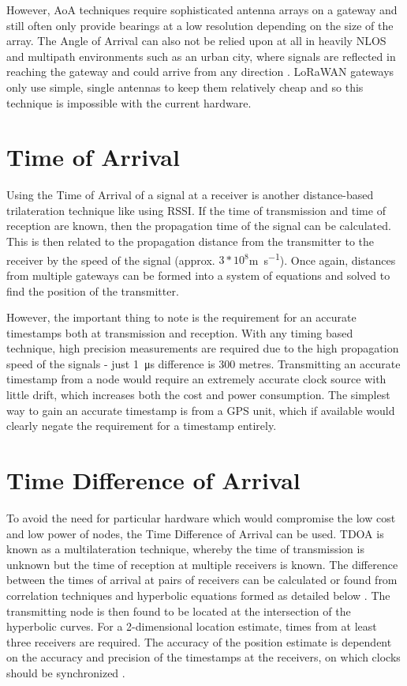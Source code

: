 \documentclass[a4paper]{report}
\begin{document}
    However, AoA techniques require sophisticated antenna arrays on a gateway and still often only provide bearings at a low resolution depending on the size of the array. The Angle of Arrival can also not be relied upon at all in heavily NLOS and multipath environments such as an urban city, where signals are reflected in reaching the gateway and could arrive from any direction \cite{Zimmerman2012}. LoRaWAN gateways only use simple, single antennas to keep them relatively cheap and so this technique is impossible with the current hardware.

  \section{Time of Arrival}
    Using the Time of Arrival of a signal at a receiver is another distance-based trilateration technique like using RSSI. If the time of transmission and time of reception are known, then the propagation time of the signal can be calculated. This is then related to the propagation distance from the transmitter to the receiver by the speed of the signal (approx. \(3*10^8\)\si{\metre\per\second}). Once again, distances from multiple gateways can be formed into a system of equations and solved to find the position of the transmitter.

    However, the important thing to note is the requirement for an accurate timestamps both at transmission and reception. With any timing based technique, high precision measurements are required due to the high propagation speed of the signals - just \SI{1}{\micro\second} difference is 300 metres. Transmitting an accurate timestamp from a node would require an extremely accurate clock source with little drift, which increases both the cost and power consumption. The simplest way to gain an accurate timestamp is from a GPS unit, which if available would clearly negate the requirement for a timestamp entirely.

  \section{Time Difference of Arrival}
    To avoid the need for particular hardware which would compromise the low cost and low power of nodes, the Time Difference of Arrival can be used. TDOA is known as a multilateration technique, whereby the time of transmission is unknown but the time of reception at multiple receivers is known. The difference between the times of arrival at pairs of receivers can be calculated or found from correlation techniques and hyperbolic equations formed as detailed below \cite{Krizmant1997}. The transmitting node is then found to be located at the intersection of the hyperbolic curves. For a 2-dimensional location estimate, times from at least three receivers are required. The accuracy of the position estimate is dependent on the accuracy and precision of the timestamps at the receivers, on which clocks should be synchronized \cite{Li}.
\end{document}
